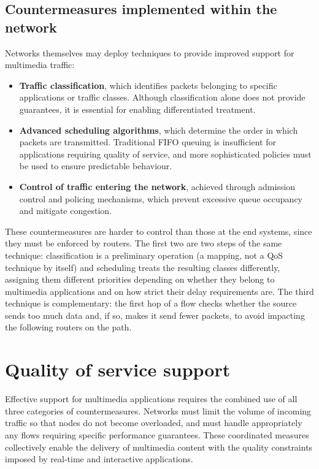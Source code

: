 \subsection{Countermeasures implemented within the network}

Networks themselves may deploy techniques to provide improved support for multimedia traffic:

\begin{itemize}
\item \textbf{Traffic classification}, which identifies packets belonging to specific applications or traffic classes. Although classification alone does not provide guarantees, it is essential for enabling differentiated treatment.
\item \textbf{Advanced scheduling algorithms}, which determine the order in which packets are transmitted. Traditional FIFO queuing is insufficient for applications requiring quality of service, and more sophisticated policies must be used to ensure predictable behaviour.
\item \textbf{Control of traffic entering the network}, achieved through admission control and policing mechanisms, which prevent excessive queue occupancy and mitigate congestion.
\end{itemize}

These countermeasures are harder to control than those at the end systems, since they must be enforced by routers. The first two are two steps of the same technique: classification is a preliminary operation (a mapping, not a QoS technique by itself) and scheduling treats the resulting classes differently, assigning them different priorities depending on whether they belong to multimedia applications and on how strict their delay requirements are. The third technique is complementary: the first hop of a flow checks whether the source sends too much data and, if so, makes it send fewer packets, to avoid impacting the following routers on the path.

\section{Quality of service support}

Effective support for multimedia applications requires the combined use of all three categories of countermeasures. Networks must limit the volume of incoming traffic so that nodes do not become overloaded, and must handle appropriately any flows requiring specific performance guarantees. These coordinated measures collectively enable the delivery of multimedia content with the quality constraints imposed by real-time and interactive applications.

